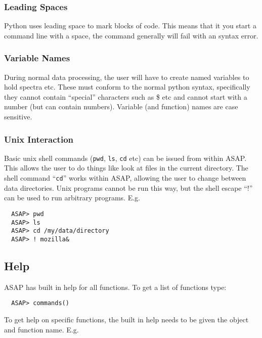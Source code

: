\documentclass[11pt]{article}
\newcommand{\cmd}[1]{{\tt #1}}
\begin{document}
\subsubsection{Leading Spaces}

Python uses leading space to mark blocks
of code. This means that it you start a command line with a space, the
command generally will fail with an syntax error.

\subsubsection{Variable Names}

During normal data processing, the user
will have to create named variables to hold spectra etc. These must
conform to the normal python syntax, specifically they cannot contain
``special'' characters such as \@ \$ etc and cannot start with a
number (but can contain numbers).  Variable (and function) names are
case sensitive.

\subsubsection{Unix Interaction}

Basic unix shell commands (\cmd{pwd},
\cmd{ls}, \cmd{cd} etc) can be issued from within ASAP. This allows
the user to do things like look at files in the current directory. The
shell command ``\cmd{cd}'' works within ASAP, allowing the user to
change between data directories. Unix programs cannot be run this way,
but the shell escape ``$!$'' can be used to run arbitrary
programs. E.g.

\begin{verbatim}
  ASAP> pwd
  ASAP> ls
  ASAP> cd /my/data/directory
  ASAP> ! mozilla&
\end{verbatim}

\subsection{Help}

ASAP has built in help for all functions. To get a list of
functions type:

\begin{verbatim}
  ASAP> commands()
\end{verbatim}

To get help on specific functions, the built in help needs to be given
the object and function name. E.g.
\end{document}
